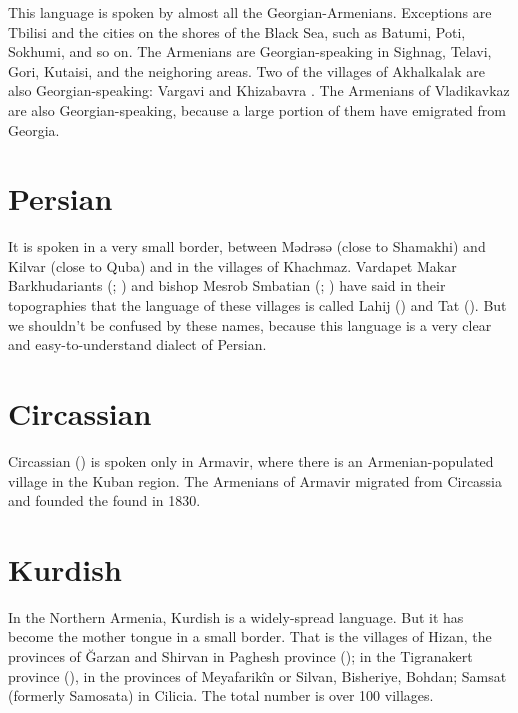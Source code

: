 This language is spoken by almost all the Georgian-Armenians. Exceptions are Tbilisi and the cities on the shores of the Black Sea, such as Batumi, Poti, Sokhumi, and so on. The Armenians are Georgian-speaking in Sighnag, Telavi, Gori, Kutaisi, and the neighoring areas. Two of the villages of Akhalkalak are also Georgian-speaking: Vargavi and Khizabavra . The Armenians of Vladikavkaz are also Georgian-speaking, because a large portion of them have emigrated from Georgia. 

\section{Persian}

It is spoken in a very small border, between Mədrəsə (close to Shamakhi) and Kilvar (close to Quba) and in the villages of Khachmaz. Vardapet Makar Barkhudariants (; ) and bishop Mesrob Smbatian (; ) have said in their topographies that the language of these villages is called Lahij () and Tat (). But we shouldn't be confused by these names, because this language is a very clear and easy-to-understand dialect of Persian.


\begin{adjarianpage}\label{page:33}\end{adjarianpage}%



\section{Circassian}

Circassian () is spoken only in Armavir, where there is an Armenian-populated village in the Kuban region. The Armenians of Armavir migrated from Circassia and founded the found in 1830.



\section{Kurdish}

In the Northern Armenia, Kurdish is a widely-spread language. But it has become the mother tongue in a small border. That is the villages of Hizan, the provinces of Ğarzan and Shirvan in Paghesh province (); in the Tigranakert province (), in the provinces of Meyafarikîn or Silvan, Bisheriye, Bohdan; Samsat (formerly Samosata) in Cilicia. The total number is over 100 villages. 

